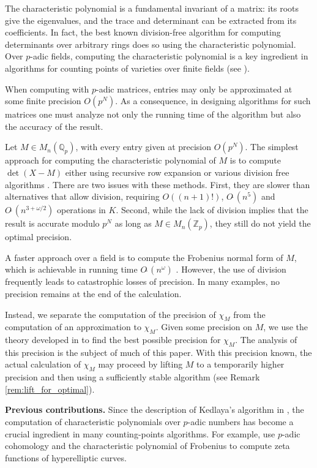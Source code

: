 \documentclass[sigconf]{acmart}
\newcommand{\Z}{\mathbb Z}
\newcommand{\Zp}{\Z_p}
\newcommand{\Q}{\mathbb Q}
\newcommand{\Qp}{\Q_p}
\newcommand{\softO}{O\tilde{~}}
\theoremstyle{definition}
\begin{document}
The characteristic polynomial is a fundamental invariant of a matrix: its roots
give the eigenvalues, and the trace and determinant can be extracted from its coefficients.
In fact, the best known division-free algorithm for computing determinants
over arbitrary rings \cite{kaltofen-villard:04a} does so using the characteristic polynomial.
Over $p$-adic fields, computing the characteristic polynomial is a key ingredient in
algorithms for counting points of varieties over finite fields (see
\cite{kedlaya:01a, harvey:07a, harvey:14a}).

When computing with $p$-adic matrices, entries may only be approximated
at some finite precision $O(p^N)$.  As a
consequence, in designing algorithms for such matrices one must analyze
not only the running time of the algorithm but also the accuracy of the result.

Let $M \in M_n(\Qp)$, with every entry given at precision $O(p^N)$.
The simplest approach for computing the characteristic polynomial of $M$
is to compute $\det(X{-}M)$ either using recursive row expansion or various division free
algorithms \cite{seifullin:02a,kaltofen:92a}.  There are two issues
with these methods.  First, they are slower than alternatives that allow division,
requiring $O((n+1)!)$, $\softO(n^5)$ and $\softO(n^{3 + \omega/2})$ operations in $K$.  Second,
while the lack of division implies that the result is accurate modulo $p^N$ as
long as $M \in M_n(\Zp)$, they still do not yield the optimal precision.

A faster approach over a field is to compute the Frobenius normal form of $M$,
which is achievable in running time $\softO(n^\omega)$ \cite{keller-gehrig:85a,pernet-storjohann:07a}.
However, the use of division frequently leads to catastrophic losses of precision.
In many examples, no precision remains at the end of the calculation.

Instead, we separate the computation of the precision of $\chi_M$ from the computation
of an approximation to $\chi_M$.  Given some precision on $M$, we use the theory developed in \cite{caruso-roe-vaccon:14a}
to find the best possible precision for $\chi_M$.  The analysis of this precision is the subject
of much of this paper.  With this precision known, the actual calculation of $\chi_M$
may proceed by lifting $M$ to a temporarily higher precision and then using a sufficiently
stable algorithm (see Remark \ref{rem:lift_for_optimal}).

\medskip

\noindent
{\bf Previous contributions.}
Since the description of Kedlaya's algorithm in
\cite{kedlaya:01a}, the computation of characteristic polynomials
over $p$-adic numbers
has become a crucial ingredient in many counting-points algorithms.
For example, \cite{harvey:07a, harvey:14a} use $p$-adic cohomology
and the characteristic polynomial of Frobenius to compute zeta functions
of hyperelliptic curves.
\end{document}
